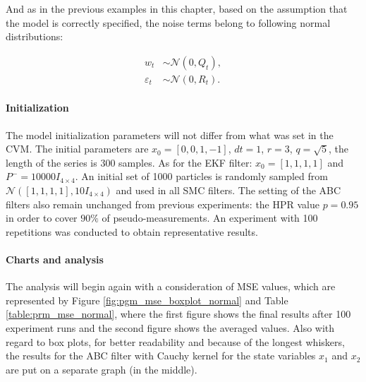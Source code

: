 And as in the previous examples in this chapter, based on the assumption that the model is correctly specified, the noise terms belong to following normal distributions:

\begin{equation}
\begin{aligned}
w_t &\sim \mathcal{N}(0, Q_t), \\
\varepsilon_t &\sim \mathcal{N}(0, R_t).
\end{aligned}
\end{equation}

\paragraph*{Initialization} The model initialization parameters will not differ from what was set in the CVM. The initial parameters are \(x_0=[0,0,1,-1] \), \(dt=1\), \(r=3\), \(q=\sqrt{5}\), the length of the series is 300 samples. As for the EKF filter: \(x_0 = [1,1,1,1]\) and \(P^{-} = 10000 I_{4 \times 4}\). An initial set of 1000 particles is randomly sampled from \(\mathcal{N}\left(\left[1,1,1,1\right], 10 I_{4 \times 4} \right)\) and used in all SMC filters. The setting of the ABC filters also remain unchanged from previous experiments: the HPR value \(p = 0.95\) in order to cover \(90\%\) of pseudo-measurements. An experiment with 100 repetitions was conducted to obtain representative results.

\paragraph*{Charts and analysis}
The analysis will begin again with a consideration of MSE values, which are represented by Figure \ref{fig:pgm_mse_boxplot_normal} and Table \ref{table:prm_mse_normal}, where the first figure shows the final results after 100 experiment runs and the second figure shows the averaged values. Also with regard to box plots, for better readability and because of the longest whiskers, the results for the ABC filter with Cauchy kernel for the state variables \(x_1\) and \(x_2\) are put on a separate graph (in the middle).

